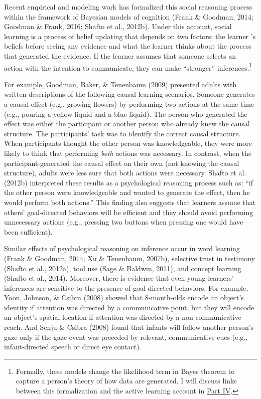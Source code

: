 \documentclass[oneside]{report}
\begin{document}
Recent empirical and modeling work has formalized this social reasoning
process within the framework of Bayesian models of cognition (Frank \&
Goodman, 2014; Goodman \& Frank, 2016; Shafto et al., 2012b). Under this
account, social learning is a process of belief updating that depends on
two factors: the learner 's beliefs before seeing any evidence and what
the learner thinks about the process that generated the evidence. If the
learner assumes that someone selects an action with the intention to
communicate, they can make ``stronger'' inferences.\footnote{Formally,
  these models change the likelihood term in Bayes theorem to capture a
  person's theory of how data are generated. I will discuss links
  between this formalization and the active learning account in
  \protect\hyperlink{p4}{Part IV}.}

For example, Goodman, Baker, \& Tenenbaum (2009) presented adults with
written descriptions of the following causal learning scenarios. Someone
generates a causal effect (e.g., growing flowers) by performing two
actions at the same time (e.g., pouring a yellow liquid and a blue
liquid). The person who generated the effect was either the participant
or another person who already knew the causal structure. The
participants' task was to identify the correct causal structure. When
participants thought the other person was knowledgeable, they were more
likely to think that performing \emph{both} actions was necessary. In
contrast, when the participant-generated the causal effect on their own
(not knowing the causal structure), adults were less sure that both
actions were necessary. Shafto et al. (2012b) interpreted these results
as a psychological reasoning process such as: ``if the other person were
knowledgeable and wanted to generate the effect, then he would perform
both actions.'' This finding also suggests that learners assume that
others' goal-directed behaviors will be efficient and they should avoid
performing unnecessary actions (e.g., pressing two buttons when pressing
one would have been sufficient).

Similar effects of psychological reasoning on inference occur in word
learning (Frank \& Goodman, 2014; Xu \& Tenenbaum, 2007b), selective
trust in testimony (Shafto et al., 2012a), tool use (Sage \& Baldwin,
2011), and concept learning (Shafto et al., 2014). Moreover, there is
evidence that even young learners' inferences are sensitive to the
presence of goal-directed behaviors. For example, Yoon, Johnson, \&
Csibra (2008) showed that 8-month-olds encode an object's identity if
attention was directed by a communicative point, but they will encode an
object's spatial location if attention was directed by a
non-communicative reach. And Senju \& Csibra (2008) found that infants
will follow another person's gaze only if the gaze event was preceded by
relevant, communicative cues (e.g., infant-directed speech or direct eye
contact).
\end{document}
